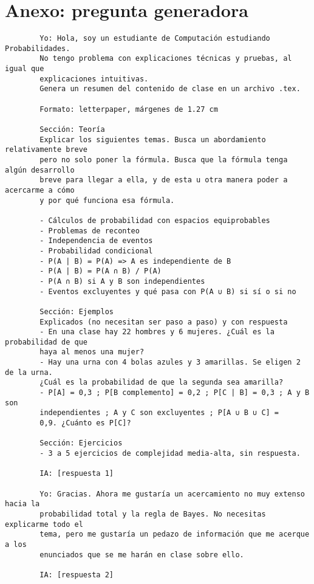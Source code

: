 \documentclass[letterpaper, 12pt]{article}
\begin{document}
	\section*{Anexo: pregunta generadora}
	\begin{verbatim}
		Yo: Hola, soy un estudiante de Computación estudiando Probabilidades.
		No tengo problema con explicaciones técnicas y pruebas, al igual que
		explicaciones intuitivas.
		Genera un resumen del contenido de clase en un archivo .tex.
		
		Formato: letterpaper, márgenes de 1.27 cm
		
		Sección: Teoría
		Explicar los siguientes temas. Busca un abordamiento relativamente breve
		pero no solo poner la fórmula. Busca que la fórmula tenga algún desarrollo
		breve para llegar a ella, y de esta u otra manera poder a acercarme a cómo
		y por qué funciona esa fórmula.
		
		- Cálculos de probabilidad con espacios equiprobables
		- Problemas de reconteo	
		- Independencia de eventos
		- Probabilidad condicional
		- P(A | B) = P(A) => A es independiente de B
		- P(A | B) = P(A ∩ B) / P(A)
		- P(A ∩ B) si A y B son independientes
		- Eventos excluyentes y qué pasa con P(A ∪ B) si sí o si no
		
		Sección: Ejemplos
		Explicados (no necesitan ser paso a paso) y con respuesta
		- En una clase hay 22 hombres y 6 mujeres. ¿Cuál es la probabilidad de que
		haya al menos una mujer?
		- Hay una urna con 4 bolas azules y 3 amarillas. Se eligen 2 de la urna.
		¿Cuál es la probabilidad de que la segunda sea amarilla?
		- P[A] = 0,3 ; P[B complemento] = 0,2 ; P[C | B] = 0,3 ; A y B son
		independientes ; A y C son excluyentes ; P[A ∪ B ∪ C] =
		0,9. ¿Cuánto es P[C]?
		
		Sección: Ejercicios
		- 3 a 5 ejercicios de complejidad media-alta, sin respuesta. 
		
		IA: [respuesta 1]
		
		Yo: Gracias. Ahora me gustaría un acercamiento no muy extenso hacia la
		probabilidad total y la regla de Bayes. No necesitas explicarme todo el
		tema, pero me gustaría un pedazo de información que me acerque a los
		enunciados que se me harán en clase sobre ello.
		
		IA: [respuesta 2]
	\end{verbatim}
	
\end{document}
